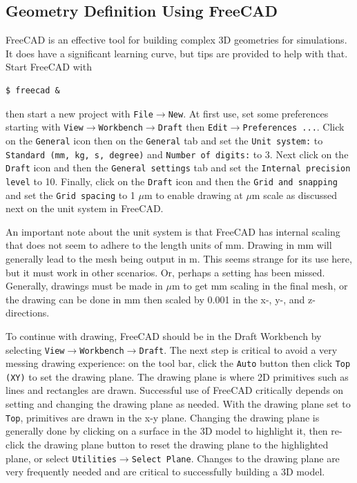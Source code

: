 \documentclass[titlepage]{article}
\renewcommand\_{\textunderscore\linebreak[1]}
\begin{document}
\subsection{Geometry Definition Using FreeCAD}
\label{sec:freecad}

FreeCAD is an effective tool for building complex 3D geometries for simulations.  It does have a significant learning curve, but tips are provided to help with that.  Start FreeCAD with
\begin{Verbatim}[fontsize=\small]
   $ freecad &
\end{Verbatim}
\noindent then start a new project with \texttt{File}$\rightarrow$\texttt{New}.
At first use, set some preferences starting with \newline \texttt{View}$\rightarrow$\texttt{Workbench}$\rightarrow$\texttt{Draft} then \texttt{Edit}$\rightarrow$\texttt{Preferences ...}.
Click on the \texttt{General} icon then on the \texttt{General} tab and set the \texttt{Unit system:} to \texttt{Standard (mm, kg, s, degree)} and \texttt{Number of digits:} to 3.
Next click on the \texttt{Draft} icon and then the \texttt{General settings} tab and set the \texttt{Internal precision level} to 10. Finally, click on the \texttt{Draft} icon and then the \texttt{Grid and snapping} and set the \texttt{Grid spacing} to 1 $\mu$m to enable drawing at $\mu$m scale as discussed next on the unit system in FreeCAD.

An important note about the unit system is that FreeCAD has internal scaling that does not seem to adhere to the length units of mm.  Drawing in mm will generally lead to the mesh being output in m.  This seems strange for its use here, but it must work in other scenarios.  Or, perhaps a setting has been missed.  Generally, drawings must be made in $\mu$m to get mm scaling in the final mesh, or the drawing can be done in mm then scaled by 0.001 in the x-, y-, and z- directions.

To continue with drawing, FreeCAD should be in the Draft Workbench by selecting \newline \texttt{View}$\rightarrow$\texttt{Workbench}$\rightarrow$\texttt{Draft}.  The next step is critical to avoid a very messing drawing experience:  on the tool bar, click the \texttt{Auto} button then click \texttt{Top (XY)} to set the drawing plane.  The drawing plane is where 2D primitives such as lines and rectangles are drawn.  Successful use of FreeCAD critically depends on setting and changing the drawing plane as needed.  With the drawing plane set to \texttt{Top}, primitives are drawn in the x-y plane.  Changing the drawing plane is generally done by clicking on a surface in the 3D model to highlight it, then re-click the drawing plane button to reset the drawing plane to the highlighted plane, or select \texttt{Utilities}$\rightarrow$\texttt{Select Plane}.  Changes to the drawing plane are very frequently needed and are critical to successfully building a 3D model. 
\end{document}
